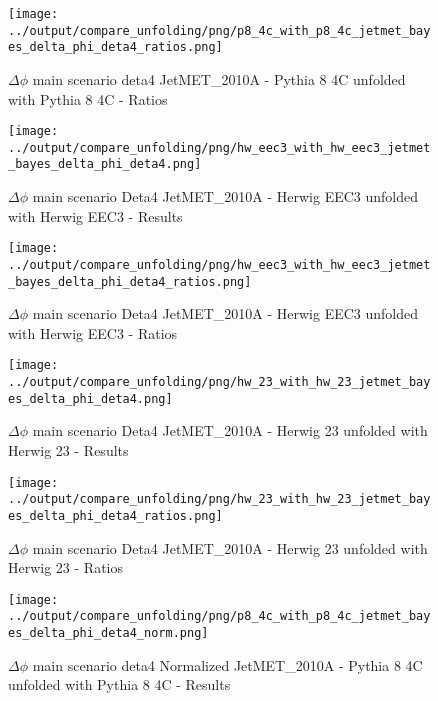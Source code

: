 \documentclass[11pt]{book}
\begin{document}
\begin{figure}[ht]
\centering
\texttt{[image: ../output/compare\_unfolding/png/p8\_4c\_with\_p8\_4c\_jetmet\_bayes\_delta\_phi\_deta4\_ratios.png]}
\caption{$\Delta\phi$ main scenario deta4 JetMET\_2010A - Pythia 8 4C unfolded with Pythia 8 4C - Ratios}
\label{p8_p8_jetmet_bayes_delta_phi_deta4_b}
\end{figure}

\begin{figure}[ht]
\centering
\texttt{[image: ../output/compare\_unfolding/png/hw\_eec3\_with\_hw\_eec3\_jetmet\_bayes\_delta\_phi\_deta4.png]}
\caption{$\Delta\phi$ main scenario Deta4 JetMET\_2010A - Herwig EEC3 unfolded with Herwig EEC3 - Results}
\label{hw_eec3_hw_eec3_jetmet_bayes_delta_phi_deta4_a}
\end{figure}

\begin{figure}[ht]
\centering
\texttt{[image: ../output/compare\_unfolding/png/hw\_eec3\_with\_hw\_eec3\_jetmet\_bayes\_delta\_phi\_deta4\_ratios.png]}
\caption{$\Delta\phi$ main scenario Deta4 JetMET\_2010A - Herwig EEC3 unfolded with Herwig EEC3 - Ratios}
\label{hw_eec3_hw_eec3_jetmet_bayes_delta_phi_deta4_b}
\end{figure}

\begin{figure}[ht]
\centering
\texttt{[image: ../output/compare\_unfolding/png/hw\_23\_with\_hw\_23\_jetmet\_bayes\_delta\_phi\_deta4.png]}
\caption{$\Delta\phi$ main scenario Deta4 JetMET\_2010A - Herwig 23 unfolded with Herwig 23 - Results}
\label{hw_23_hw_23_jetmet_bayes_delta_phi_deta4_a}
\end{figure}

\begin{figure}[ht]
\centering
\texttt{[image: ../output/compare\_unfolding/png/hw\_23\_with\_hw\_23\_jetmet\_bayes\_delta\_phi\_deta4\_ratios.png]}
\caption{$\Delta\phi$ main scenario Deta4 JetMET\_2010A - Herwig 23 unfolded with Herwig 23 - Ratios}
\label{hw_23_hw_23_jetmet_bayes_delta_phi_deta4_b}
\end{figure}


\begin{figure}[ht]
\centering
\texttt{[image: ../output/compare\_unfolding/png/p8\_4c\_with\_p8\_4c\_jetmet\_bayes\_delta\_phi\_deta4\_norm.png]}
\caption{$\Delta\phi$ main scenario deta4 Normalized JetMET\_2010A - Pythia 8 4C unfolded with Pythia 8 4C - Results}
\label{p8_p8_jetmet_bayes_delta_phi_deta4_norm_a}
\end{figure}
\end{document}
